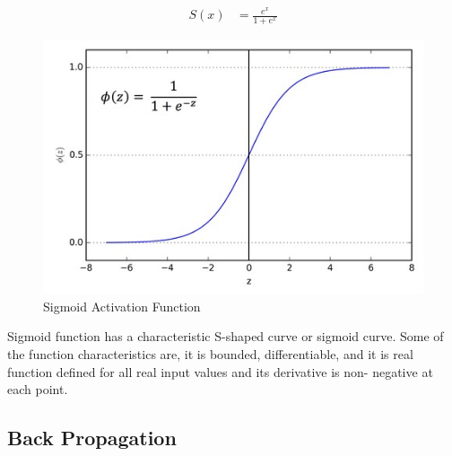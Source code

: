 \begin{align*}
S(x)&=\frac{e^{x}}{1+e^{x}}
\end{align*}

\begin{figure}[!ht]
        \centering\includegraphics[width=\columnwidth]
        {images/sigmoid-activation-function.jpeg}
        \caption{Sigmoid Activation Function}\label{s:Sigmoid-function}
\end{figure}

Sigmoid function has a characteristic S-shaped curve or sigmoid curve. Some of
the function characteristics are, it is bounded, differentiable, and it is
real function defined for all real input values and its derivative is non-
negative at each point.




\subsection{Back Propagation}

